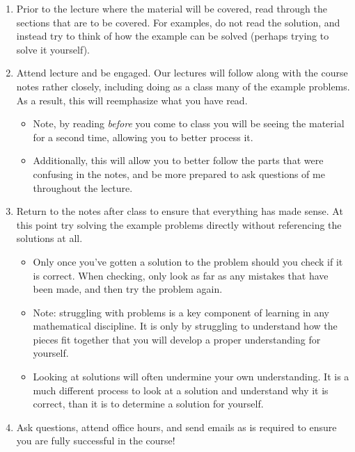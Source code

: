 \documentclass[
  letterpaper,
  DIV=11,
  numbers=noendperiod]{scrreprt}
\providecommand{\tightlist}{%
  \setlength{\itemsep}{0pt}\setlength{\parskip}{0pt}}\usepackage{longtable,booktabs,array}
\theoremstyle{definition}
\theoremstyle{definition}
\theoremstyle{definition}
\theoremstyle{remark}
\begin{document}
\begin{enumerate}
\def\labelenumi{\arabic{enumi}.}
\tightlist
\item
  Prior to the lecture where the material will be covered, read through
  the sections that are to be covered. For examples, do not read the
  solution, and instead try to think of how the example can be solved
  (perhaps trying to solve it yourself).
\item
  Attend lecture and be engaged. Our lectures will follow along with the
  course notes rather closely, including doing as a class many of the
  example problems. As a result, this will reemphasize what you have
  read.

  \begin{itemize}
  \tightlist
  \item
    Note, by reading \emph{before} you come to class you will be seeing
    the material for a second time, allowing you to better process it.
  \item
    Additionally, this will allow you to better follow the parts that
    were confusing in the notes, and be more prepared to ask questions
    of me throughout the lecture.
  \end{itemize}
\item
  Return to the notes after class to ensure that everything has made
  sense. At this point try solving the example problems directly without
  referencing the solutions at all.

  \begin{itemize}
  \tightlist
  \item
    Only once you've gotten a solution to the problem should you check
    if it is correct. When checking, only look as far as any mistakes
    that have been made, and then try the problem again.
  \item
    Note: struggling with problems is a key component of learning in any
    mathematical discipline. It is only by struggling to understand how
    the pieces fit together that you will develop a proper understanding
    for yourself.
  \item
    Looking at solutions will often undermine your own understanding. It
    is a much different process to look at a solution and understand why
    it is correct, than it is to determine a solution for yourself.
  \end{itemize}
\item
  Ask questions, attend office hours, and send emails as is required to
  ensure you are fully successful in the course!
\end{enumerate}
\end{document}
